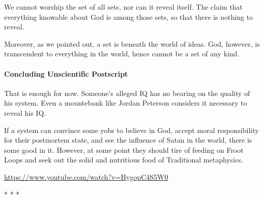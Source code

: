 We cannot worship the set of all sets, nor can it reveal itself. The claim that everything knowable about God is among those sets, so that there is nothing to reveal.

Moreover, as we pointed out, a set is beneath the world of ideas. God, however, is transcendent to everything in the world, hence cannot be a set of any kind.

\paragraph{Concluding Unscientific Postscript}


That is enough for now. Someone's alleged IQ has no bearing on the quality of his system. Even a mountebank like Jordan Peterson considers it necessary to reveal his IQ.

If a system can convince some yobs to believe in God, accept moral responsibility for their postmortem state, and see the influence of Satan in the world, there is some good in it. However, at some point they should tire of feeding on Froot Loops and seek out the solid and nutritious food of Traditional metaphysics.

\url{https://www.youtube.com/watch?v=HygopC4S5W0}


\begin{center}* * *\end{center}

